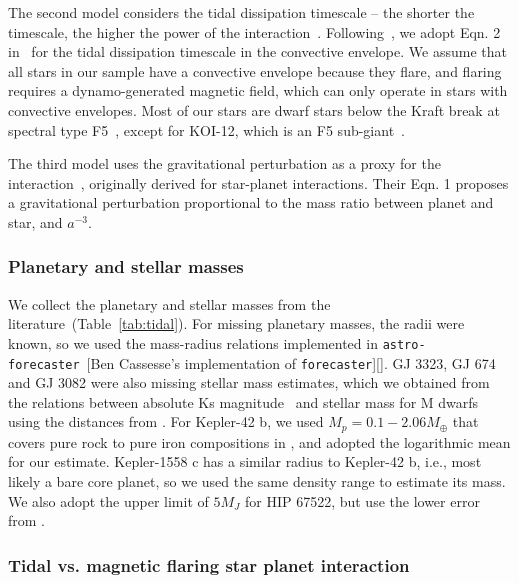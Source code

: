 \documentclass[twocolumn]{aastex631}
\begin{document}
The second model considers the tidal dissipation timescale -- the shorter the timescale, the higher the power of the interaction~\citep{zahn1977tidal}. Following~\citet{ilic2022tidal}, we adopt Eqn. 2 in~\citet{albrecht2012obliquities} for the tidal dissipation timescale in the convective envelope. We assume that all stars in our sample have a convective envelope because they flare, and flaring requires a dynamo-generated magnetic field, which can only operate in stars with convective envelopes. Most of our stars are dwarf stars below the Kraft break at spectral type F5~\citep{kraft1967studies}, except for KOI-12, which is an F5 sub-giant~\citep{frasca2016activity}.

The third model uses the gravitational perturbation as a proxy for the interaction~\citep{cuntz2000stellar}, originally derived for star-planet interactions.  Their Eqn. 1 proposes a gravitational perturbation proportional to the mass ratio between planet and star, and $a^{-3}$. 

\subsubsection{Planetary and stellar masses}

We collect the planetary and stellar masses from the literature~(Table~\ref{tab:tidal}). For missing planetary masses, the radii were known, so we used the mass-radius relations implemented in \texttt{astro-forecaster}~[Ben Cassesse's implementation of \texttt{forecaster}][]\citep{chen2017probabilistic}. GJ 3323, GJ 674 and GJ 3082 were also missing stellar mass estimates, which we obtained from the \citep{mann2015how, mann2016erratum} relations between absolute Ks magnitude~\citep{skrutskie2006two} and stellar mass for M dwarfs using the distances from \citet{bailer-jones2021estimating}. For Kepler-42 b, we used  $M_p=0.1-2.06M_\oplus$ that covers pure rock to pure iron compositions in \citet{muirhead2012characterizing}, and adopted the logarithmic mean for our estimate. Kepler-1558 c has a similar radius to Kepler-42 b, i.e., most likely a bare core planet, so we used the same density range to estimate its mass. We also adopt the upper limit of $5M_J$ for HIP 67522, but use the lower error from \citet{chen2017probabilistic}. 

\subsubsection{Tidal vs. magnetic flaring star planet interaction}
\end{document}
